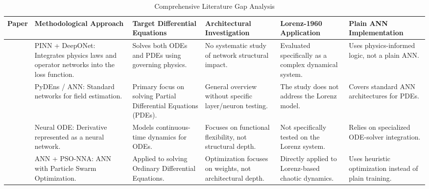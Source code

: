 \begin{table}[!ht] %
    \centering
    \caption{Comprehensive Literature Gap Analysis}
    \label{tab:gap_analysis_updated}
    \tiny %
    \renewcommand{\arraystretch}{1.0} 
    \setlength{\tabcolsep}{2pt} %
    
    \begin{tabularx}{\textwidth}{| 
        >{\hsize=0.6\hsize\raggedright\arraybackslash}X | 
        >{\hsize=1.15\hsize\raggedright\arraybackslash}X | 
        >{\hsize=1.15\hsize\raggedright\arraybackslash}X | 
        >{\hsize=1.05\hsize\raggedright\arraybackslash}X | 
        >{\hsize=1.05\hsize\raggedright\arraybackslash}X | 
        >{\hsize=1.0\hsize\raggedright\arraybackslash}X |
        }
        \hline
        \textbf{Paper} & \textbf{Methodological Approach} & \textbf{Target Differential Equations} & \textbf{Architectural Investigation} & \textbf{Lorenz-1960 Application} & \textbf{Plain ANN Implementation} \\
        \hline
        
        \cite{matthews2024pinnde} & PINN + DeepONet: Integrates physics laws and operator networks into the loss function. & Solves both ODEs and PDEs using governing physics. & No systematic study of network structural impact. & Evaluated specifically as a complex dynamical system. & Uses physics-informed logic, not a plain ANN. \\
        \hline
        
        \cite{pratama2022ann} & PyDEns / ANN: Standard networks for field estimation. & Primary focus on solving Partial Differential Equations (PDEs). & General overview without specific layer/neuron testing. & The study does not address the Lorenz model. & Covers standard ANN architectures for PDEs. \\
        \hline
        
        \cite{chen2018neural} & Neural ODE: Derivative represented as a neural network. & Models continuous-time dynamics for ODEs. & Focuses on functional flexibility, not structural depth. & Not specifically tested on the Lorenz system. & Relies on specialized ODE-solver integration. \\
        \hline
        
        \cite{aslam2024neuro} & ANN + PSO-NNA: ANN with Particle Swarm Optimization. & Applied to solving Ordinary Differential Equations. & Optimization focuses on weights, not architectural depth. & Directly applied to Lorenz-based chaotic dynamics. & Uses heuristic optimization instead of plain training. \\
        \hline
        

\end{tabularx}
\end{table}
